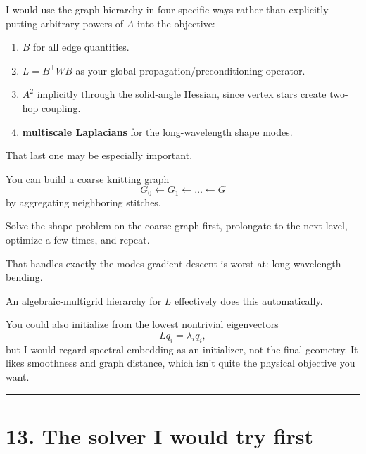 \documentclass[11pt]{article}
\begin{document}
I would use the graph hierarchy in four specific ways rather than
explicitly putting arbitrary powers of \(A\) into the objective:
\begin{enumerate}
  \item \textbf{\(B\)} for all edge quantities.
  \item \textbf{\(L=B^\top WB\)} as your global propagation/preconditioning
        operator.
  \item \textbf{\(A^2\)} implicitly through the solid-angle Hessian, since
        vertex stars create two-hop coupling.
  \item \textbf{multiscale Laplacians} for the long-wavelength shape modes.
\end{enumerate}
That last one may be especially important.

You can build a coarse knitting graph
\[
G_0\leftarrow G_1\leftarrow\dots\leftarrow G
\]
by aggregating neighboring stitches.

Solve the shape problem on the coarse graph first, prolongate to the next
level, optimize a few times, and repeat.

That handles exactly the modes gradient descent is worst at:
long-wavelength bending.

An algebraic-multigrid hierarchy for \(L\) effectively does this
automatically.

You could also initialize from the lowest nontrivial eigenvectors
\[
Lq_i=\lambda_iq_i,
\]
but I would regard spectral embedding as an initializer, not the final
geometry. It likes smoothness and graph distance, which isn't quite the
physical objective you want.

\bigskip\hrule

\section*{13. The solver I would try first}
\end{document}
